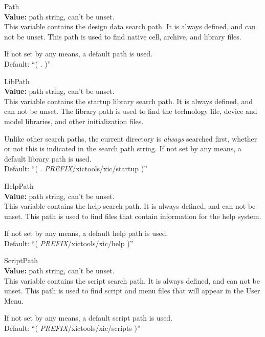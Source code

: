 \begin{description}
\item{\et Path}\\
{\bf Value:} path string, can't be unset.\\
This variable contains the design data search path.  It is always
defined, and can not be unset.  This path is used to find native cell,
archive, and library files.

If not set by any means, a default path is used.\\
Default: ``( {\vt .} )''

\item{\et LibPath}\\
{\bf Value:} path string, can't be unset.\\
This variable contains the startup library search path.  It is always
defined, and can not be unset.  The library path is used to find the
technology file, device and model libraries, and other initialization
files.

Unlike other search paths, the current directory is {\it always}
searched first, whether or not this is indicated in the search path
string.  If not set by any means, a default library path is used.\\
Default: ``( {\vt .} {\it PREFIX\/}{\vt /xictools/xic/startup} )''

\item{\et HelpPath}\\
{\bf Value:} path string, can't be unset.\\
This variable contains the help search path.  It is always defined,
and can not be unset.  This path is used to find files that contain
information for the help system.

If not set by any means, a default help path is used.\\
Default: ``( {\it PREFIX\/}{\vt /xictools/xic/help} )''

\item{\et ScriptPath}\\
{\bf Value:} path string, can't be unset.\\
This variable contains the script search path.  It is always defined,
and can not be unset.  This path is used to find script and menu files
that will appear in the {\cb User Menu}.

If not set by any means, a default script path is used.\\
Default: ``( {\it PREFIX\/}{\vt /xictools/xic/scripts} )''
\end{description}


